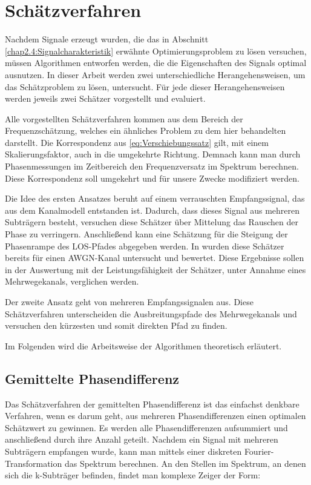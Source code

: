 \chapter{Schätzverfahren}
\label{chap3:Schätzverfahren}
Nachdem Signale erzeugt wurden, die das in Abschnitt \ref{chap2.4:Signalcharakteristik} erwähnte Optimierungsproblem zu lösen versuchen, müssen Algorithmen entworfen werden, die die Eigenschaften des Signals optimal ausnutzen. 
In dieser Arbeit werden zwei unterschiedliche Herangehensweisen, um das Schätzproblem zu lösen, untersucht. Für jede dieser Herangehensweisen werden jeweils zwei Schätzer vorgestellt und evaluiert. 

Alle vorgestellten Schätzverfahren kommen aus dem Bereich der Frequenzschätzung, welches ein ähnliches Problem zu dem hier behandelten darstellt. Die Korrespondenz aus \eqref{eq:Verschiebungssatz} gilt, mit einem Skalierungsfaktor, auch in die umgekehrte Richtung. Demnach kann man durch Phasenmessungen im Zeitbereich den Frequenzversatz im Spektrum berechnen. Diese Korrespondenz soll umgekehrt und für unsere Zwecke modifiziert werden.

Die Idee des ersten Ansatzes beruht auf einem verrauschten Empfangssignal, das aus dem Kanalmodell entstanden ist. Dadurch, dass dieses Signal aus mehreren Subträgern besteht, versuchen diese Schätzer über Mittelung das Rauschen der Phase zu verringern. Anschließend kann eine Schätzung für die Steigung der Phasenrampe des LOS-Pfades abgegeben werden. In \cite[S.93]{mengali1997synchronization} wurden diese Schätzer bereits für einen \gls{AWGN}-Kanal untersucht und bewertet. Diese Ergebnisse sollen in der Auswertung mit der Leistungsfähigkeit der Schätzer, unter Annahme eines Mehrwegekanals, verglichen werden.


Der zweite Ansatz geht von mehreren Empfangssignalen aus. Diese Schätzverfahren unterscheiden die Ausbreitungspfade des Mehrwegekanals und versuchen den kürzesten und somit direkten Pfad zu finden.

Im Folgenden wird die Arbeitsweise der Algorithmen theoretisch erläutert.

\section{Gemittelte Phasendifferenz}
\label{chap3.1:gemittelte Phasendifferenz}
Das Schätzverfahren der gemittelten Phasendifferenz ist das einfachst denkbare Verfahren, wenn es darum geht, aus mehreren Phasendifferenzen einen optimalen Schätzwert zu gewinnen. Es werden alle Phasendifferenzen aufsummiert und anschließend durch ihre Anzahl geteilt. 
Nachdem ein Signal mit mehreren Subträgern empfangen wurde, kann man mittels einer diskreten Fourier-Transformation das Spektrum berechnen. An den Stellen im Spektrum, an denen sich die k-Subträger befinden, findet man komplexe Zeiger der Form: 

